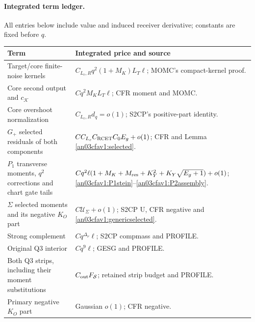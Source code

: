 \documentclass[11pt]{article}
\theoremstyle{remark}\newtheorem{remark}[theorem]{Remark}
\newcommand{\KK}{\mathcal K}
\begin{document}
\paragraph{Integrated term ledger.}
All entries below include value and induced receiver derivative;
constants are fixed before $q$.
\begin{longtable}{>{\raggedright\arraybackslash}p{}
 >{\raggedright\arraybackslash}p{}}
\textbf{Term}&\textbf{Integrated price and source}\\\hline
Target/core finite-noise kernels&
$C_{L_c,R}q^2(1+M_K)L_T\ell$; MOMC's compact-kernel proof.\\
Core second output and $c_{\KK}$&
$Cq^2M_KL_T\ell$; CFR moment and MOMC.\\
Core overshoot normalization&
$C_{L_c,R}d_q=o(1)$; S2CP's positive-part identity.\\
$G_+$ selected residuals of both components&
$C C_{L_c}C_{\rm RCET}C_0E_g+o(1)$;
CFR and Lemma \ref{an03cfav1:selected}.\\
$P_1$ transverse moments, $q^2$ corrections and chart gate tails&
$Cq^2\ell(1+M_K+M_{\rm res}+K_Y^2+K_Y\sqrt{E_g+1})
 +o(1)$; \eqref{an03cfav1:P1stein}--\eqref{an03cfav1:P2assembly}.\\
$\Sigma$ selected moments and its negative $K_O$ part&
$C\mathcal U_\Sigma+o(1)$; S2CP U, CFR negative and
\eqref{an03cfav1:genericselected}.\\
Strong complement&
$Cq^{\Delta_\nu}\ell$; S2CP compmass and PROFILE.\\
Original Q3 interior&
$Cq^9\ell$; GESG and PROFILE.\\
Both Q3 strips, including their moment substitutions&
$C_{\rm out}F_{\mathcal S}$; retained strip budget and PROFILE.\\
Primary negative $K_O$ part&
Gaussian $o(1)$; CFR negative.\\
\end{longtable}
\end{document}
